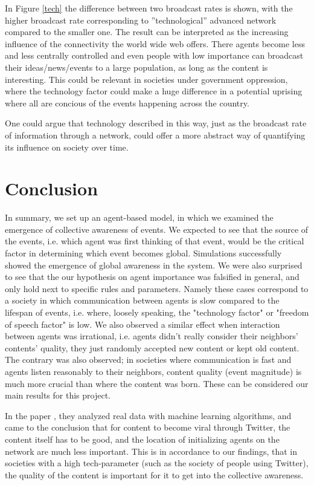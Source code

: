 \documentclass [12pt,a4paper,twoside]{article}
\begin{document}
In Figure \ref{tech} the difference between two broadcast rates is shown, with the higher broadcast rate corresponding to ''technological'' advanced network compared to the smaller one. The result can be interpreted as the increasing influence of the connectivity the world wide web offers. There agents become less and less centrally controlled and even people with low importance can broadcast their ideas/news/events to a large population, as long as the content is interesting. This could be relevant in societies under government oppression, where the technology factor could make a huge difference in a potential uprising where all are concious of the events happening across the country. 

One could argue that technology described in this way, just as the broadcast rate of information through a network, could offer a more abstract way of quantifying its influence on society over time.



\section{Conclusion}

In summary, we set up an agent-based model, in which we examined the emergence of collective awareness of events. We expected to see that the source of the events, i.e. which agent was first thinking of that event, would be the critical factor in determining which event becomes global. Simulations successfully showed the emergence of global awareness in the system. We were also surprised to see that the our hypothesis on agent importance was falsified in general, and only hold next to specific rules and parameters. Namely these cases correspond to a society in which communication between agents is slow compared to the lifespan of events, i.e. where, loosely speaking, the "technology factor" or "freedom of speech factor" is low. We also observed a similar effect when interaction between agents was irrational, i.e. agents didn't really consider their neighbors' contents' quality, they just randomly accepted new content or kept old content. The contrary was also observed; in societies where communication is fast and agents listen reasonably to their neighbors, content quality (event magnitude) is much more crucial than where the content was born. These can be considered our main results for this project.

In the paper \cite{Similar-results}, they analyzed real data with machine learning algorithms, and came to the conclusion that for content to become viral through Twitter, the content itself has to be good, and the location of initializing agents on the network are much less important. This is in accordance to our findings, that in societies with a high tech-parameter (such as the society of people using Twitter), the quality of the content is important for it to get into the collective awareness.
\end{document}
